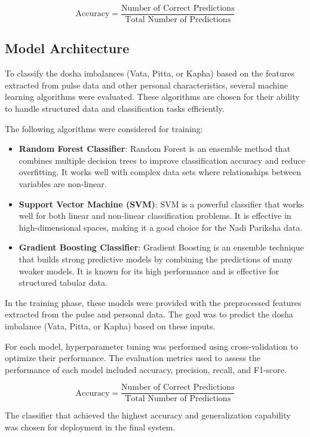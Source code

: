 \documentclass[10pt,twocolumn]{article}
\begin{document}
\[
\text{Accuracy} = \frac{\text{Number of Correct Predictions}}{\text{Total Number of Predictions}}
\]

\subsection{Model Architecture}

To classify the dosha imbalances (Vata, Pitta, or Kapha) based on the features extracted from pulse data and other personal characteristics, several machine learning algorithms were evaluated. These algorithms are chosen for their ability to handle structured data and classification tasks efficiently.

The following algorithms were considered for training:

\begin{itemize}
    \item \textbf{Random Forest Classifier}: Random Forest is an ensemble method that combines multiple decision trees to improve classification accuracy and reduce overfitting. It works well with complex data sets where relationships between variables are non-linear.
    \item \textbf{Support Vector Machine (SVM)}: SVM is a powerful classifier that works well for both linear and non-linear classification problems. It is effective in high-dimensional spaces, making it a good choice for the Nadi Pariksha data.
    \item \textbf{Gradient Boosting Classifier}: Gradient Boosting is an ensemble technique that builds strong predictive models by combining the predictions of many weaker models. It is known for its high performance and is effective for structured tabular data.
\end{itemize}

In the training phase, these models were provided with the preprocessed features extracted from the pulse and personal data. The goal was to predict the dosha imbalance (Vata, Pitta, or Kapha) based on these inputs.

For each model, hyperparameter tuning was performed using cross-validation to optimize their performance. The evaluation metrics used to assess the performance of each model included accuracy, precision, recall, and F1-score.

\[
\text{Accuracy} = \frac{\text{Number of Correct Predictions}}{\text{Total Number of Predictions}}
\]

The classifier that achieved the highest accuracy and generalization capability was chosen for deployment in the final system.
\end{document}
